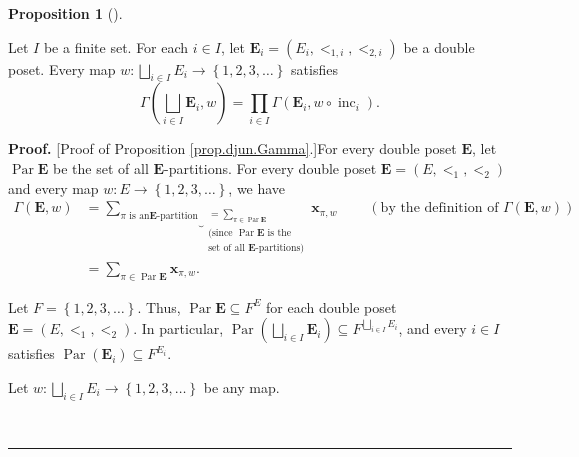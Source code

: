 \documentclass[numbers=enddot,12pt,final,onecolumn,notitlepage,abstracton]{scrartcl}
\theoremstyle{definition}
\newtheorem{prop}[theo]{Proposition}
\newenvironment{proposition}[1][]
{\begin{prop}[#1]\begin{leftbar}}
{\end{leftbar}\end{prop}}
\newenvironment{proof}[1][Proof]{\noindent\textbf{#1.} }{\ \rule{0.5em}{0.5em}}
\let\sumnonlimits\sum
\let\prodnonlimits\prod
\renewcommand{\sum}{\sumnonlimits\limits}
\renewcommand{\prod}{\prodnonlimits\limits}
\newenvironment{verlong}{}{}
\begin{document}
\begin{verlong}
\begin{footnotesize}
\begin{proposition}
\label{prop.djun.Gamma}Let $I$ be a finite set. For each $i\in I$, let
$\mathbf{E}_{i}=\left(  E_{i},<_{1,i},<_{2,i}\right)  $ be a double poset.
Every map $w:\bigsqcup_{i\in I}E_{i}\rightarrow\left\{  1,2,3,\ldots\right\}
$ satisfies%
\[
\Gamma\left(  \bigsqcup_{i\in I}\mathbf{E}_{i},w\right)  =\prod_{i\in I}%
\Gamma\left(  \mathbf{E}_{i},w\circ\operatorname*{inc}\nolimits_{i}\right)  .
\]

\end{proposition}

\begin{proof}
[Proof of Proposition \ref{prop.djun.Gamma}.]For every double poset
$\mathbf{E}$, let $\operatorname*{Par}\mathbf{E}$ be the set of all
$\mathbf{E}$-partitions. For every double poset $\mathbf{E}=\left(
E,<_{1},<_{2}\right)  $ and every map $w:E\rightarrow\left\{  1,2,3,\ldots
\right\}  $, we have%
\begin{align}
\Gamma\left(  \mathbf{E},w\right)   &  =\underbrace{\sum_{\pi\text{ is an
}\mathbf{E}\text{-partition}}}_{\substack{=\sum_{\pi\in\operatorname*{Par}%
\mathbf{E}}\\\text{(since }\operatorname*{Par}\mathbf{E}\text{ is
the}\\\text{set of all }\mathbf{E}\text{-partitions)}}}\mathbf{x}_{\pi
,w}\ \ \ \ \ \ \ \ \ \ \left(  \text{by the definition of }\Gamma\left(
\mathbf{E},w\right)  \right) \nonumber\\
&  =\sum_{\pi\in\operatorname*{Par}\mathbf{E}}\mathbf{x}_{\pi,w}.
\label{pf.prop.djun.Gamma.1}%
\end{align}


Let $F=\left\{  1,2,3,\ldots\right\}  $. Thus, $\operatorname*{Par}%
\mathbf{E}\subseteq F^{E}$ for each double poset $\mathbf{E}=\left(
E,<_{1},<_{2}\right)  $. In particular, $\operatorname*{Par}\left(
\bigsqcup_{i\in I}\mathbf{E}_{i}\right)  \subseteq F^{\bigsqcup_{i\in I}E_{i}%
}$, and every $i\in I$ satisfies $\operatorname*{Par}\left(  \mathbf{E}%
_{i}\right)  \subseteq F^{E_{i}}$.

Let $w:\bigsqcup_{i\in I}E_{i}\rightarrow\left\{  1,2,3,\ldots\right\}  $ be
any map.


\end{proof}
\end{footnotesize}
\end{verlong}
\end{document}

